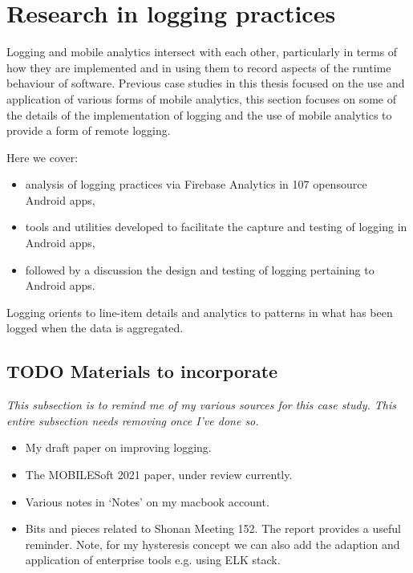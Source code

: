 \section{Research in logging practices}
Logging and mobile analytics intersect with each other, particularly in terms of how they are implemented and in using them to record aspects of the runtime behaviour of software. Previous case studies in this thesis focused on the use and application of various forms of mobile analytics, this section focuses on some of the details of the implementation of logging and the use of mobile analytics to provide a form of remote logging. 

Here we cover:
\begin{itemize}
    \item analysis of logging practices via Firebase Analytics in 107 opensource Android apps,
    \item tools and utilities developed to facilitate the capture and testing of logging in Android apps,
    \item followed by a discussion the design and testing of logging pertaining to Android apps.
\end{itemize}

Logging orients to line-item details and analytics to patterns in what has been logged when the data is aggregated.

\subsection{TODO Materials to incorporate}
\textit{This subsection is to remind me of my various sources for this case study. This entire subsection needs removing once I've done so.}
\begin{itemize}
    \item My draft paper on improving logging.
    \item The MOBILESoft 2021 paper, under review currently.
    \item Various notes in `Notes' on my macbook account.
    \item Bits and pieces related to Shonan Meeting 152. The report provides a useful reminder. Note, for my hysteresis concept we can also add the adaption and application of enterprise tools e.g. using ELK stack.  
\end{itemize}


